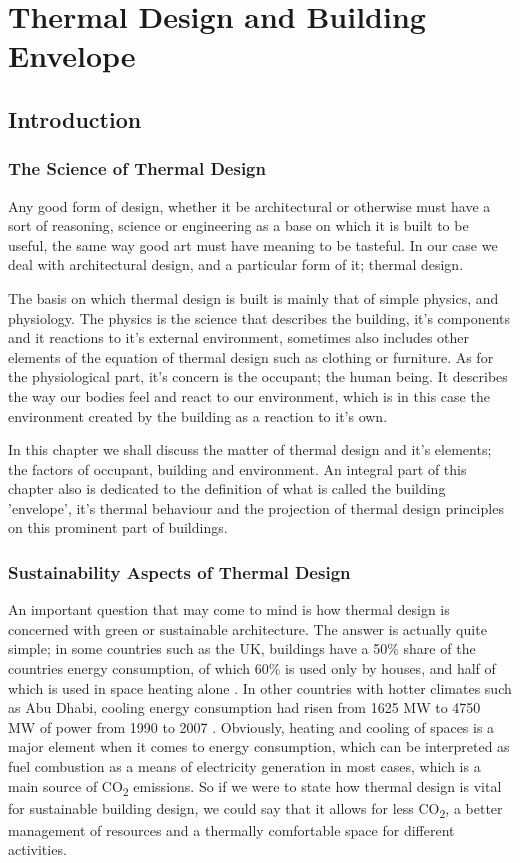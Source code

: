 \chapter{Thermal Design and Building Envelope}
\section{Introduction}

\subsection{The Science of Thermal Design}
Any good form of design, whether it be architectural or otherwise must have a sort of reasoning,
science or engineering as a base on which it is built to be useful, the same way good art must have
meaning to be tasteful. In our case we deal with architectural design, and a particular form of it;
thermal design.

The basis on which thermal design is built is mainly that of simple physics, and physiology. The
physics is the science that describes the building, it's components and it reactions to it's
external environment, sometimes also includes other elements of the equation of thermal design such
as clothing or furniture. As for the physiological part, it's concern is the occupant; the human
being. It describes the way our bodies feel and react to our environment, which is in this case the
environment created by the building as a reaction to it's own.

In this chapter we shall discuss the matter of thermal design and it's elements; the
factors of occupant, building and environment. An integral part of this
chapter also is dedicated to the definition of what is called the building 'envelope', it's thermal
behaviour and the projection of thermal design principles on this prominent part of buildings.

\subsection{Sustainability Aspects of Thermal Design}
An important question that may come to mind is how thermal design is concerned with green or
sustainable architecture. The answer is actually quite simple; in some countries such as the UK,
buildings have a 50\% share of the countries energy consumption, of which 60\% is used only by
houses, and half of which is used in space heating alone \cite{edwards96}. In
other countries with hotter climates such as Abu Dhabi, cooling energy consumption had risen from
1625 MW to 4750 MW of power from 1990 to 2007 \cite{nauman07}. Obviously, heating and cooling of
spaces is a major element when it comes to energy consumption, which can be interpreted as fuel
combustion as a means of electricity generation in most cases, which is a main source of
CO\textsubscript{2} emissions. So if we were to state how thermal design is vital for sustainable
building design, we could say that it allows for less CO\textsubscript{2}, a better management of
resources and a thermally comfortable space for different activities.

